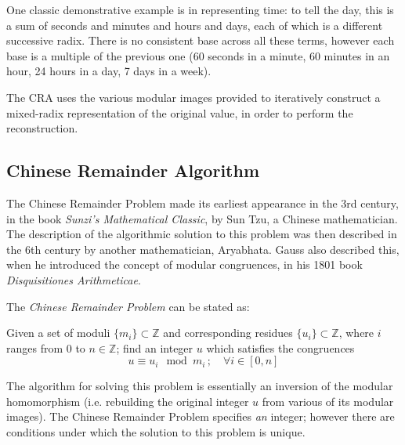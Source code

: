 \documentclass[letterpaper,12pt,titlepage,oneside,final]{book}
\begin{document}
One classic demonstrative example is in representing time: to tell the day, this is a sum of seconds and minutes and hours and days, each of which is a different successive radix.  There is no consistent base across all these terms, however each base is a multiple of the previous one (60 seconds in a minute, 60 minutes in an hour, 24 hours in a day, 7 days in a week).     

The CRA uses the various modular images provided to iteratively construct a mixed-radix representation of the original value, in order to perform the reconstruction.


\subsection{Chinese Remainder Algorithm} 

The Chinese Remainder Problem made its earliest appearance in the 3rd century, in the book \textit{Sunzi's Mathematical Classic}, by Sun Tzu, a Chinese mathematician.  The description of the algorithmic solution to this problem was then described in the 6th century by another mathematician, Aryabhata.  Gauss also described this, when he introduced the concept of modular congruences, in his 1801 book \textit{Disquisitiones Arithmeticae}.  

\noindent The \textit{Chinese Remainder Problem} can be stated as: 
\begin{addmargin}[2em]{2em}%
  Given a set of moduli ${\{m_i\} \subset \mathbb{Z}}$ and corresponding residues ${\{u_i\} \subset \mathbb{Z}}$, where ${i}$ ranges from 0 to ${n \in \mathbb{Z}}$; find an integer ${u}$ which satisfies the congruences
  \begin{equation*}
    u \equiv u_i \mod m_i\, ; \quad \forall i \in [0, n]
  \end{equation*} 
\end{addmargin}

The algorithm for solving this problem is essentially an inversion of the modular homomorphism (i.e. rebuilding the original integer ${u}$ from various of its modular images).  The Chinese Remainder Problem specifies \textit{an} integer; however there are conditions under which the solution to this problem is unique.   
\end{document}
